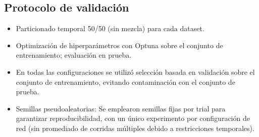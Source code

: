 \subsection{Protocolo de validación}
\begin{itemize}
    \item Particionado temporal 50/50 (sin mezcla) para cada dataset.
    \item Optimización de hiperparámetros con Optuna sobre el conjunto de entrenamiento; evaluación en prueba. 
    \item En todas las configuraciones se utilizó selección basada en validación sobre el conjunto de entrenamiento, evitando contaminación con el conjunto de prueba.
    \item Semillas pseudoaleatorias: Se emplearon semillas fijas por trial para garantizar reproducibilidad, con un único experimento por configuración de red (sin promediado de corridas múltiples debido a restricciones temporales).
\end{itemize}
